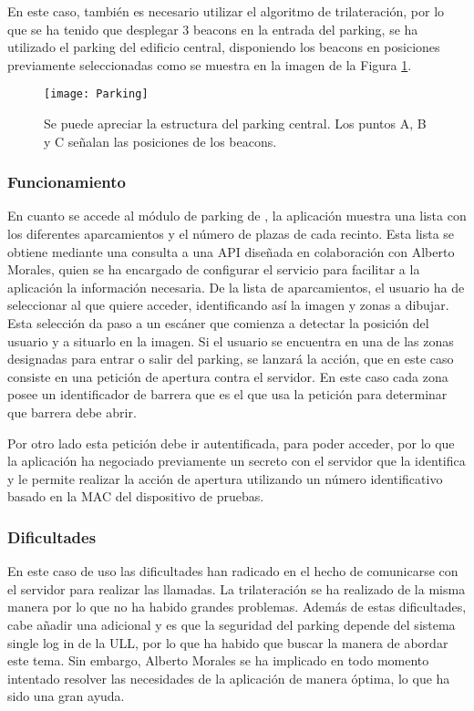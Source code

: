En este caso, también es necesario utilizar el algoritmo de trilateración, por lo que se ha tenido que desplegar 3 beacons en la entrada del parking, se ha utilizado el parking del edificio central, disponiendo los beacons en posiciones previamente seleccionadas como se muestra en la imagen de la Figura \ref{fig:parking}.

\begin{figure}[H]
	\centering
	\texttt{[image: Parking]}
	\label{fig:parking}
	\caption{Se puede apreciar la estructura del parking central. Los puntos A, B y C señalan las posiciones de los beacons.}
\end{figure}

\subsubsection{Funcionamiento}


En cuanto se accede al módulo de parking de \BulletPoint{}, la aplicación muestra una lista con los diferentes aparcamientos y el número de plazas de cada recinto. Esta lista se obtiene mediante una consulta a una API diseñada en colaboración con Alberto Morales, quien se ha encargado de configurar el servicio para facilitar a la aplicación la información necesaria. De la lista de aparcamientos, el usuario ha de seleccionar al que quiere acceder, identificando así la imagen y zonas a dibujar. Esta selección da paso a un escáner que comienza a detectar la posición del usuario y a situarlo en la imagen. Si el usuario se encuentra en una de las zonas designadas para entrar o salir del parking, se lanzará la acción, que en este caso consiste en una petición de apertura contra el servidor. En este caso cada zona posee un identificador de barrera que es el que usa la petición para determinar que barrera debe abrir. 


Por otro lado esta petición debe ir autentificada, para poder acceder, por lo que la aplicación ha negociado previamente un secreto con el servidor que la identifica y le permite realizar la acción de apertura utilizando un número identificativo basado en la MAC del dispositivo de pruebas.


\subsubsection{Dificultades}

En este caso de uso las dificultades han radicado en el hecho de comunicarse con el servidor para realizar las llamadas. La trilateración se ha realizado de la misma manera por lo que no ha habido grandes problemas. Además de estas dificultades, cabe añadir una adicional y es que la seguridad del parking depende del sistema single log in de la ULL, por lo que ha habido que buscar la manera de abordar este tema. Sin embargo, Alberto Morales se ha implicado en todo momento intentado resolver las necesidades de la aplicación de manera óptima, lo que ha sido una gran ayuda.

